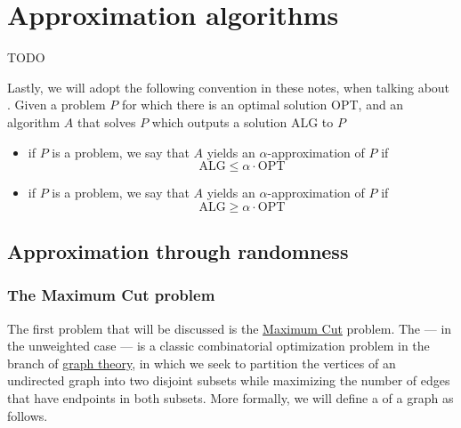 \documentclass[a4paper, 12pt]{report}
\institute{\curlyquotes{\hspace{0.25mm}Sapienza} Università di Roma}
\subtitle{Appunti integrati con il libro \book}
\author{\textit{Autore}\\\authorName}
\institute{\curlyquotes{\hspace{0.25mm}Sapienza} University of Rome}
\subtitle{Lecture notes integrated with the book \book}
\author{\textit{Author}\\\authorName}
\title{\courseName}
\date{\today}
\begin{document}
    \maketitle

    {
        \hypersetup{allcolors=black}

        \romantableofcontents
    }

    \introduction


    \chapter{Approximation algorithms}

    TODO 

    Lastly, we will adopt the following convention in these notes, when talking about . Given a problem $P$ for which there is an optimal solution OPT, and an algorithm $A$ that solves $P$ which outputs a solution ALG to $P$

    \begin{itemize}
        \item if $P$ is a  problem, we say that $A$ yields an $\alpha$-approximation of $P$ if $$\mathrm{ALG} \le \alpha \cdot \mathrm{OPT}$$
        \item if $P$ is a  problem, we say that $A$ yields an $\alpha$-approximation of $P$ if $$\mathrm{ALG} \ge \alpha \cdot \mathrm{OPT}$$
    \end{itemize}

    \section{Approximation through randomness}

    \subsection{The Maximum Cut problem} \label{maxcut}

    The first problem that will be discussed is the \href{https://en.wikipedia.org/wiki/Maximum_cut}{Maximum Cut} problem. The  --- in the unweighted case --- is a classic combinatorial optimization problem in the branch of \href{https://en.wikipedia.org/wiki/Graph_theory}{graph theory}, in which we seek to partition the vertices of an undirected graph into two disjoint subsets while maximizing the number of edges that have endpoints in both subsets. More formally, we will define a  of a graph as follows.
\end{document}
